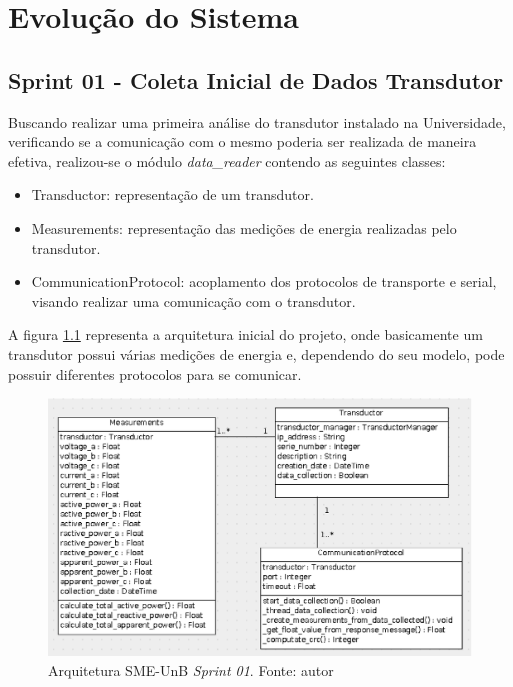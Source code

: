 \chapter{Evolução do Sistema}

\section{Sprint 01 - Coleta Inicial de Dados Transdutor}
Buscando realizar uma primeira análise do transdutor instalado na Universidade, verificando se a comunicação com o mesmo poderia ser realizada de maneira efetiva, realizou-se o módulo \textit{data\_reader} contendo as seguintes classes:
\begin{itemize}
    \item Transductor: representação de um transdutor.
    \item Measurements: representação das medições de energia realizadas pelo transdutor.
    \item CommunicationProtocol: acoplamento dos protocolos de transporte e serial, visando realizar uma comunicação com o transdutor.
\end{itemize}

A figura \ref{sprint01arq} representa a arquitetura inicial do projeto, onde basicamente um transdutor possui várias medições de energia e, dependendo do seu modelo, pode possuir diferentes protocolos para se comunicar.

\begin{figure}[!htpb]
    \centering
    \includegraphics[keepaspectratio=true,scale=0.6]{figuras/sprint01arq.eps}
    \caption{Arquitetura SME-UnB \textit{Sprint 01}. Fonte: autor}
    \label{sprint01arq}
\end{figure}

